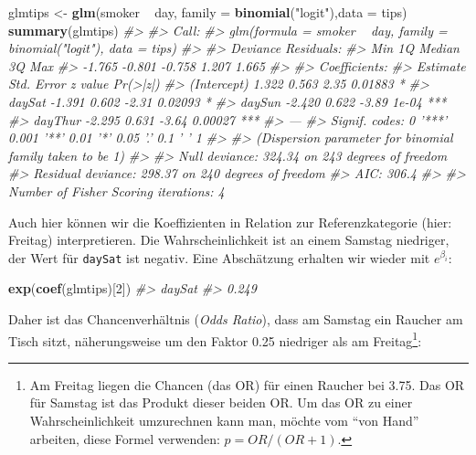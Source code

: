 \documentclass[12pt,]{book}
\newenvironment{Shaded}{\begin{snugshade}}{\end{snugshade}}
\newcommand{\KeywordTok}[1]{\textcolor[rgb]{0.13,0.29,0.53}{\textbf{{#1}}}}
\newcommand{\DataTypeTok}[1]{\textcolor[rgb]{0.13,0.29,0.53}{{#1}}}
\newcommand{\DecValTok}[1]{\textcolor[rgb]{0.00,0.00,0.81}{{#1}}}
\newcommand{\StringTok}[1]{\textcolor[rgb]{0.31,0.60,0.02}{{#1}}}
\newcommand{\CommentTok}[1]{\textcolor[rgb]{0.56,0.35,0.01}{\textit{{#1}}}}
\newcommand{\NormalTok}[1]{{#1}}
\let\rmarkdownfootnote\footnote%
\def\footnote{\protect\rmarkdownfootnote}
\begin{document}
\begin{Shaded}
\begin{Highlighting}[]
\NormalTok{glmtips <-}\StringTok{ }\KeywordTok{glm}\NormalTok{(smoker ~}\StringTok{ }\NormalTok{day, }\DataTypeTok{family =} \KeywordTok{binomial}\NormalTok{(}\StringTok{"logit"}\NormalTok{),}\DataTypeTok{data =} \NormalTok{tips)}
\KeywordTok{summary}\NormalTok{(glmtips)}
\CommentTok{#> }
\CommentTok{#> Call:}
\CommentTok{#> glm(formula = smoker ~ day, family = binomial("logit"), data = tips)}
\CommentTok{#> }
\CommentTok{#> Deviance Residuals: }
\CommentTok{#>    Min      1Q  Median      3Q     Max  }
\CommentTok{#> -1.765  -0.801  -0.758   1.207   1.665  }
\CommentTok{#> }
\CommentTok{#> Coefficients:}
\CommentTok{#>             Estimate Std. Error z value Pr(>|z|)    }
\CommentTok{#> (Intercept)    1.322      0.563    2.35  0.01883 *  }
\CommentTok{#> daySat        -1.391      0.602   -2.31  0.02093 *  }
\CommentTok{#> daySun        -2.420      0.622   -3.89    1e-04 ***}
\CommentTok{#> dayThur       -2.295      0.631   -3.64  0.00027 ***}
\CommentTok{#> ---}
\CommentTok{#> Signif. codes:  0 '***' 0.001 '**' 0.01 '*' 0.05 '.' 0.1 ' ' 1}
\CommentTok{#> }
\CommentTok{#> (Dispersion parameter for binomial family taken to be 1)}
\CommentTok{#> }
\CommentTok{#>     Null deviance: 324.34  on 243  degrees of freedom}
\CommentTok{#> Residual deviance: 298.37  on 240  degrees of freedom}
\CommentTok{#> AIC: 306.4}
\CommentTok{#> }
\CommentTok{#> Number of Fisher Scoring iterations: 4}
\end{Highlighting}
\end{Shaded}

Auch hier können wir die Koeffizienten in Relation zur Referenzkategorie
(hier: Freitag) interpretieren. Die Wahrscheinlichkeit ist an einem
Samstag niedriger, der Wert für \texttt{daySat} ist negativ. Eine
Abschätzung erhalten wir wieder mit \(e^{\beta_i}\):

\begin{Shaded}
\begin{Highlighting}[]
\KeywordTok{exp}\NormalTok{(}\KeywordTok{coef}\NormalTok{(glmtips)[}\DecValTok{2}\NormalTok{])}
\CommentTok{#> daySat }
\CommentTok{#>  0.249}
\end{Highlighting}
\end{Shaded}

Daher ist das Chancenverhältnis (\emph{Odds Ratio}), dass am Samstag ein
Raucher am Tisch sitzt, näherungsweise um den Faktor 0.25 niedriger als
am Freitag\footnote{Am Freitag liegen die Chancen (das OR) für einen
  Raucher bei 3.75. Das OR für Samstag ist das Produkt dieser beiden OR.
  Um das OR zu einer Wahrscheinlichkeit umzurechnen kann man, möchte vom
  ``von Hand'' arbeiten, diese Formel verwenden: \(p = OR / (OR + 1)\).}:
\end{document}

